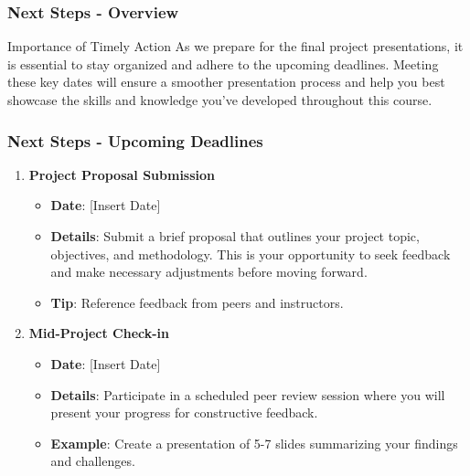 \documentclass[aspectratio=169]{beamer}
\begin{document}
\begin{frame}[fragile]
    \frametitle{Next Steps - Overview}
    \begin{block}{Importance of Timely Action}
        As we prepare for the final project presentations, it is essential to stay organized and adhere to the upcoming deadlines. Meeting these key dates will ensure a smoother presentation process and help you best showcase the skills and knowledge you've developed throughout this course.
    \end{block}
\end{frame}

\begin{frame}[fragile]
    \frametitle{Next Steps - Upcoming Deadlines}
    \begin{enumerate}
        \item \textbf{Project Proposal Submission}  
            \begin{itemize}
                \item \textbf{Date}: [Insert Date]
                \item \textbf{Details}: Submit a brief proposal that outlines your project topic, objectives, and methodology. This is your opportunity to seek feedback and make necessary adjustments before moving forward.
                \item \textbf{Tip}: Reference feedback from peers and instructors.
            \end{itemize}
        
        \item \textbf{Mid-Project Check-in}  
            \begin{itemize}
                \item \textbf{Date}: [Insert Date]
                \item \textbf{Details}: Participate in a scheduled peer review session where you will present your progress for constructive feedback.
                \item \textbf{Example}: Create a presentation of 5-7 slides summarizing your findings and challenges.
            \end{itemize}
    \end{enumerate}
\end{frame}
\end{document}
